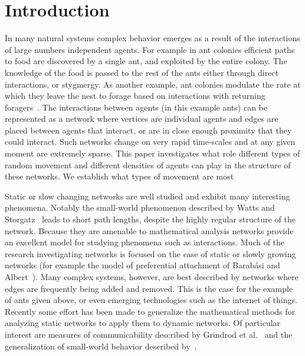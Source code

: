 \documentclass[conference]{IEEEtran}
\begin{document}

%
\IEEEpeerreviewmaketitle

\section{Introduction}
\label{sec:intro}
In many natural systems complex behavior emerges as a result of the
interactions of large numbers independent agents. For example in ant
colonies efficient paths to food are discovered by a single ant, and
exploited by the entire colony. The knowledge of the food is passed to
the rest of the ants either through direct interactions, or
stygmergy. As another example, ant colonies modulate the rate at which
they leave the nest to forage based on interactions with returning
foragers~\cite{Pinter2013}. The interactions between agents (in this
example ants) can be represented as a network where vertices are
individual agents and edges are placed between agents that interact,
or are in close enough proximity that they could interact. Such
networks change on very rapid time-scales and at any given moment are
extremely sparse. This paper investigates what role different types of
random movement and different densities of agents can play in the
structure of these networks. We establish what types of movement are
most 

Static or slow changing networks are well studied and exhibit many
interesting phenomena. Notably the small-world phenomenon described by
Watts and Storgatz~\cite{Watts1998} leads to short path lengths,
despite the highly regular structure of the network. Because they are
amenable to mathematical analysis networks provide an excellent model
for studying phenomena such as interactions. Much of the research
investigating networks is focused on the case of static or slowly
growing networks (for example the model of preferential attachment of
Barab\'asi and Albert~\cite{Barabasi1999}). Many complex systems,
however, are best described by networks where edges are frequently
being added and removed. This is the case for the example of ants
given above, or even emerging technologies such as the internet of
things. Recently some effort has been made to generalize the
mathematical methods for analyzing static networks to apply them to
dynamic networks. Of particular interest are measures of
communicability described by Grindrod et al.~\cite{Grindrod2011} and
the generalization of small-world behavior described
by~\cite{Tang2010}.
\end{document}
